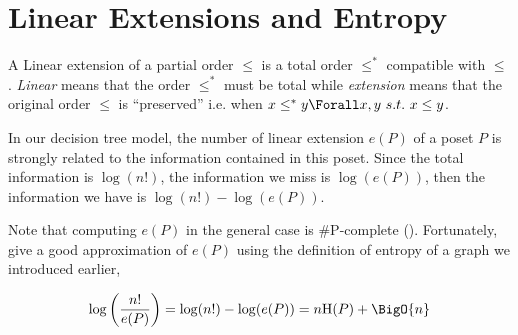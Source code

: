 \section{Linear Extensions and Entropy}

A Linear extension of a partial order $\leq$ is a total order $\leq^*$ compatible with $\leq$. \emph{Linear} means that the order $\leq^*$ must be total while \emph{extension} means that the original order $\leq$ is ``preserved'' i.e. when $x \leq^* y \Forall x, y~s.t.~x \leq y$.

In our decision tree model, the number of linear extension $e(P)$ of a poset $P$ is strongly related to the information contained in this poset. Since the total information is $\log(n!)$, the information we miss is $\log(e(P))$, then the information we have is $\log(n!) - \log(e(P))$.


Note that computing $e(P)$ in the general case is \#P-complete (\cite{brightwell1991counting}). Fortunately, \cite{kahnkim1} give a good approximation of $e(P)$ using the definition of entropy of a graph we introduced earlier,

\begin{equation}
\log\left(\frac{n!}{e(P)}\right) = \log(n!) - \log(e(P)) = n \text{H}(P) + \BigO{n}
\label{eq:khankim1}
\end{equation}